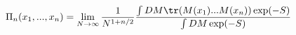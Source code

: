 \begin{equation}\label{Greens}
    \Pi_n(x_1,...,x_n)=\lim_{N \to
    \infty}\frac{1}{N^{1+n/2}}\dfrac{\int DM \tr( M(x_1)... M(x_n))\exp
    (-S)}{\int DM \exp (-S)}
\end{equation}

